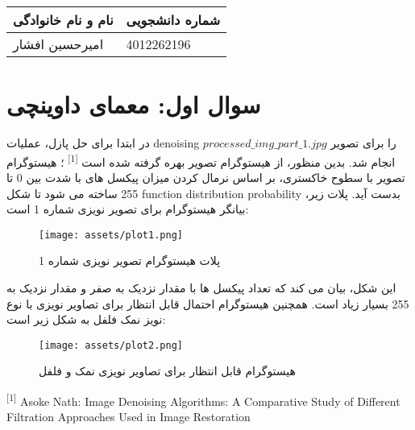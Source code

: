 \documentclass[a4paper,12pt]{article}
\begin{document}
	
	\begin{table}[h]
		\centering
		\begin{tabular}{|l|l|}
			\hline
			\textbf{نام و نام خانوادگی} & \textbf{شماره دانشجویی} \\
			\hline
			امیرحسین افشار & 4012262196 \\
			\hline
		\end{tabular}
	\end{table}
	
\hline

	
	\section{سوال اول: معمای داوینچی}
	 در ابتدا برای حل پازل، عملیات denoising را برای تصویر
$processed\_img\_part\_1.jpg$
انجام شد. بدین منظور، از هیستوگرام تصویر بهره گرفته شده است \textsuperscript{[1]} ؛ هیستوگرام تصویر با سطوح خاکستری، بر اساس نرمال کردن میزان پیکسل های با شدت بین 0 تا 255 ساخته می شود تا شکل 
function distribution probability
بدست آید.
 پلات زیر، بیانگر هیستوگرام برای تصویر نویزی شماره 1 است:

\begin{figure}[h]
		\centering
		\texttt{[image: assets/plot1.png]}
		\caption{\textcolor{CustomAccent}{پلات هیستوگرام تصویر نویزی شماره 1}}
	\end{figure}
	
	این شکل، بیان می کند که تعداد پیکسل ها با مقدار نزدیک به صفر و مقدار نزدیک به 255 بسیار زیاد است. همچنین هیستوگرام احتمال قابل انتظار برای تصاویر نویزی با نوع نویز نمک فلفل به شکل زیر است:
	
\begin{figure}[h]
	\centering
	\texttt{[image: assets/plot2.png]}
	\caption{\textcolor{CustomAccent}{هیستوگرام قابل انتظار برای تصاویر نویزی نمک و فلفل}}
\end{figure}

\vfill
\hline
\begin{LTR}
	\begin{latin}
		\begin{center}
			\begin{minipage}{0.9\linewidth}
				\small %
				\textsuperscript{[1]} Asoke Nath: Image Denoising Algorithms: A Comparative Study of Different Filtration Approaches Used in Image Restoration
			\end{minipage}
		\end{center}
	\end{latin}
\end{LTR}
\end{document}
